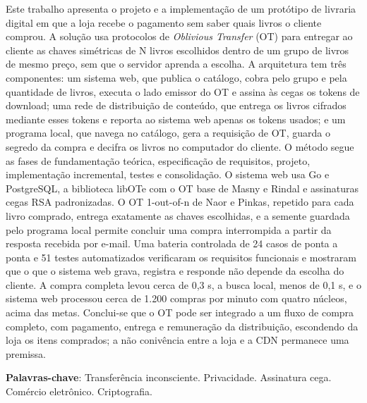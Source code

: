 \documentclass[
	12pt,				%
	openright,			%
	twoside,			%
	a4paper,			%
	english,			%
	french,				%
	spanish,			%
	brazil				%
	]{abntex2}
\begin{document}
\setlength{\absparsep}{18pt} %
\begin{resumo}
 Este trabalho apresenta o projeto e a implementação de um protótipo de livraria
 digital em que a loja recebe o pagamento sem saber quais livros o cliente
 comprou. A solução usa protocolos de \emph{Oblivious Transfer} (OT) para
 entregar ao cliente as chaves simétricas de N livros escolhidos dentro de um
 grupo de livros de mesmo preço, sem que o servidor aprenda a escolha. A
 arquitetura tem três componentes: um sistema web, que publica o catálogo, cobra
 pelo grupo e pela quantidade de livros, executa o lado emissor do OT e assina
 às cegas os tokens de download; uma rede de distribuição de conteúdo, que
 entrega os livros cifrados mediante esses tokens e reporta ao sistema web
 apenas os tokens usados; e um programa local, que navega no catálogo, gera a
 requisição de OT, guarda o segredo da compra e decifra os livros no computador
 do cliente. O método segue as fases de fundamentação teórica, especificação de
 requisitos, projeto, implementação incremental, testes e consolidação. O
 sistema web usa Go e PostgreSQL, a biblioteca libOTe com o OT base de Masny e
 Rindal e assinaturas cegas RSA padronizadas. O OT 1-out-of-n de Naor e Pinkas,
 repetido para cada livro comprado, entrega exatamente as chaves escolhidas, e
 a semente guardada pelo programa local permite concluir uma compra
 interrompida a partir da resposta recebida por e-mail. Uma bateria controlada
 de 24 casos de ponta a ponta e 51 testes automatizados verificaram os
 requisitos funcionais e mostraram que o que o sistema web grava, registra e
 responde não depende da escolha do cliente. A compra completa levou cerca de
 0,3 s, a busca local, menos de 0,1 s, e o sistema web processou cerca de
 1.200 compras por minuto com quatro núcleos, acima das metas. Conclui-se que o
 OT pode ser integrado a um fluxo de compra completo, com pagamento, entrega e
 remuneração da distribuição, escondendo da loja os itens comprados; a não
 conivência entre a loja e a CDN permanece uma premissa.

 \textbf{Palavras-chave}: Transferência inconsciente. Privacidade. Assinatura cega. Comércio eletrônico. Criptografia.
\end{resumo}
\end{document}

